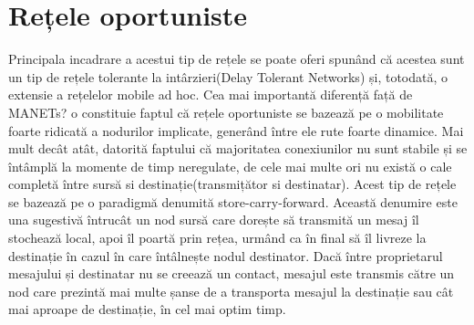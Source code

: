 \documentclass[12pt,a4paper]{report}
\begin{document}
\section{Rețele oportuniste}
Principala incadrare a acestui tip de rețele se poate oferi spunând că acestea sunt un tip de rețele tolerante la intârzieri(Delay Tolerant Networks) și, totodată, o extensie a rețelelor mobile ad hoc. Cea mai importantă diferență față de MANETs? o constituie faptul că rețele oportuniste se bazează pe o mobilitate foarte ridicată a nodurilor implicate, generând între ele rute foarte dinamice. Mai mult decât atât, datorită faptului că majoritatea conexiunilor nu sunt stabile și se întâmplă la momente de timp neregulate, de cele mai multe ori nu există o cale completă între sursă si destinație(transmițător si destinatar). Acest tip de rețele se bazează pe o paradigmă denumită store-carry-forward. Această denumire este una sugestivă întrucât un nod sursă care dorește să transmită un mesaj îl stochează local, apoi îl poartă prin rețea, urmând ca în final să îl livreze la destinație în cazul în care întâlnește nodul destinator. Dacă între proprietarul mesajului și destinatar nu se creează un contact, mesajul este transmis către un nod care prezintă mai multe șanse de a transporta mesajul la destinație sau cât mai aproape de destinație, în cel mai optim timp.
\end{document}
